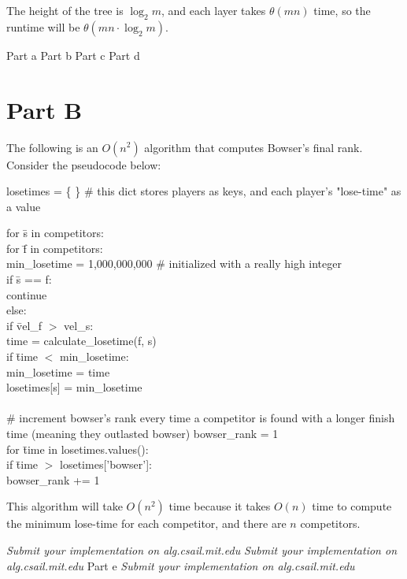 \documentclass[12pt,twoside]{article}
\begin{document}
\begin{problems}
\begin{problemparts}
The height of the tree is $\log_2 m$, and each layer takes $\theta(mn)$ time, so the runtime will be $\theta(mn \cdot \log_2 m)$.



\end{problemparts}


\problem  %

\begin{problemparts}
\problempart Part a %
\problempart Part b %
\problempart Part c %
\problempart Part d %
\end{problemparts}

\section*{Part B}

\problem
\begin{problemparts}
\problempart The following is an $O(n^2)$ algorithm that computes Bowser's final rank. Consider the pseudocode below:
\bigskip

losetimes =  \{ \}  \# this dict stores players as keys, and each player's "lose-time" as a value

\begin{tabbing}
for \= s in competitors: \\
	\> for \= f in competitors: \\
		\>\> min\_losetime = 1,000,000,000  \# initialized with a really high integer \\
		\>\> if \= s == f:\\
			\>\>\> continue\\
		\>\>else:\\
			\>\>\>if \=vel\_f $>$ vel\_s:\\
				\>\>\>\>time = calculate\_losetime(f, s)\\
				\>\>\>\>if \= time $<$ min\_losetime:\\
					\>\>\>\>\>min\_losetime = time\\
	\>losetimes[s] = min\_losetime\\
	\\
	\# increment bowser's rank every time a competitor is found with a longer finish time (meaning they outlasted bowser)
	bowser\_rank = 1\\
	for \=time in losetimes.values():\\
		\>if \=time $>$ losetimes['bowser']:\\
			\>\>bowser\_rank += 1\\
\end{tabbing}
\smallskip
This algorithm will take $O(n^2)$ time because it takes $O(n)$ time to compute the minimum lose-time for each competitor, and there are $n$ competitors. 


\problempart \emph{Submit your implementation on alg.csail.mit.edu}
\problempart \emph{Submit your implementation on alg.csail.mit.edu}
\problempart Part e %
\problempart \emph{Submit your implementation on alg.csail.mit.edu}
\end{problemparts}

\end{problems}
\end{document}
